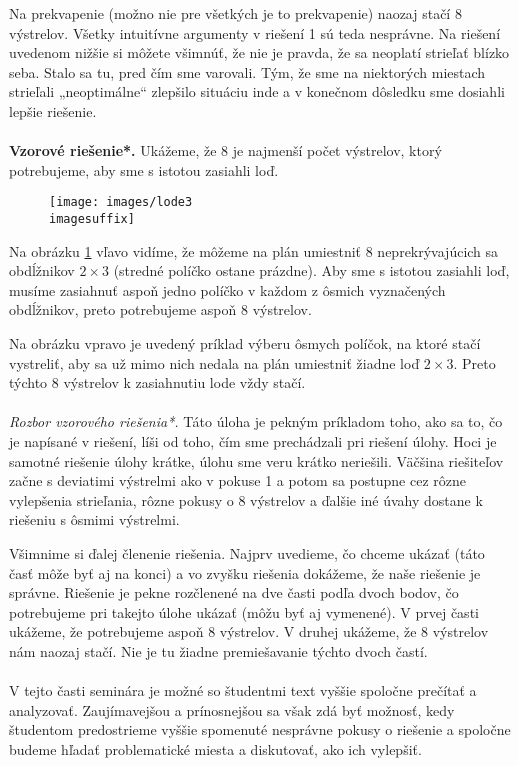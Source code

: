 {{Na prekvapenie (možno nie pre všetkých je to prekvapenie) naozaj stačí 8 výstrelov. Všetky intuitívne argumenty v riešení 1 sú teda nesprávne. Na riešení uvedenom nižšie si môžete všimnúť, že nie je pravda, že sa neoplatí strieľať blízko seba. Stalo sa tu, pred čím sme varovali. Tým, že sme na niektorých miestach strieľali „neoptimálne“ zlepšilo situáciu inde a v konečnom dôsledku sme dosiahli lepšie riešenie.\\
\\
\textbf{Vzorové riešenie*.} Ukážeme, že 8 je najmenší počet výstrelov, ktorý potrebujeme, aby sme s istotou zasiahli loď.

\begin{figure}[h]
    \centering
    \texttt{[image: images/lode3\\imagesuffix]}
    \caption{}
    \label{fig:lode3}
\end{figure}


Na obrázku \ref{fig:lode3} vľavo vidíme, že môžeme na plán umiestniť 8 neprekrývajúcich sa obdĺžnikov $2\times 3$ (stredné políčko ostane prázdne). Aby sme s istotou zasiahli loď, musíme zasiahnuť aspoň jedno políčko v každom z ôsmich vyznačených obdĺžnikov, preto potrebujeme aspoň 8 výstrelov.

Na obrázku vpravo je uvedený príklad výberu ôsmych políčok, na ktoré stačí vystreliť, aby sa už mimo nich nedala na plán umiestniť žiadne loď $2\times3$. Preto týchto 8 výstrelov k zasiahnutiu lode vždy stačí.\\
\\
\textit{Rozbor vzorového riešenia*.} Táto úloha je pekným príkladom toho, ako sa to, čo je napísané v riešení, líši od toho, čím sme prechádzali pri riešení úlohy. Hoci je samotné riešenie úlohy krátke, úlohu sme veru krátko neriešili. Väčšina riešiteľov začne s deviatimi výstrelmi ako v pokuse 1 a potom sa postupne cez rôzne vylepšenia strieľania, rôzne pokusy o 8 výstrelov a ďalšie iné úvahy dostane k riešeniu s ôsmimi výstrelmi.

Všimnime si ďalej členenie riešenia. Najprv uvedieme, čo chceme ukázať (táto časť môže byť aj na konci) a vo zvyšku riešenia dokážeme, že naše riešenie je správne. Riešenie je pekne rozčlenené na dve časti podľa dvoch bodov, čo potrebujeme pri takejto úlohe ukázať (môžu byť aj vymenené). V prvej časti ukážeme, že potrebujeme aspoň 8 výstrelov. V druhej ukážeme, že 8 výstrelov nám naozaj stačí. Nie je tu žiadne premiešavanie týchto dvoch častí.\\
\\
\kom V tejto časti seminára je možné so študentmi text vyššie spoločne prečítať a analyzovať. Zaujímavejšou a prínosnejšou sa však zdá byť možnosť, kedy študentom predostrieme vyššie spomenuté nesprávne pokusy o riešenie a spoločne budeme hľadať problematické miesta a diskutovať, ako ich vylepšiť.
}

}
